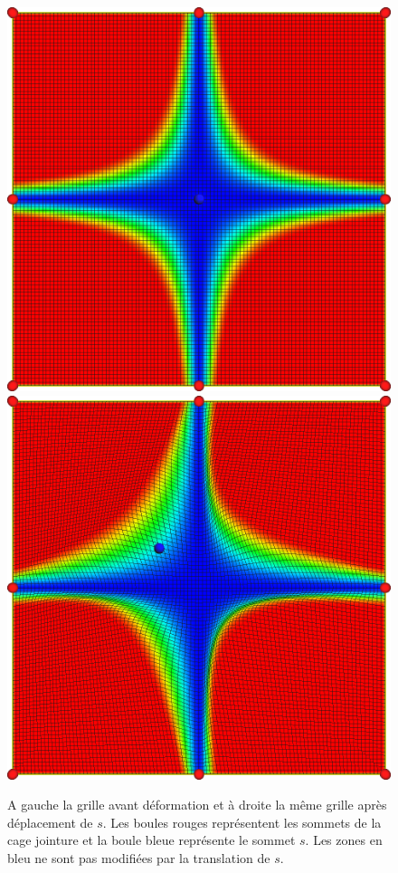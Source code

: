\begin{figure}[h]
  \begin{center}
    \includegraphics[scale=0.35]{starCage-jointure}
    \includegraphics[scale=0.35]{starCage-jointure-deformation}
    \caption{A gauche la grille avant déformation et à droite la même
      grille après déplacement de $s$. Les boules rouges représentent
      les sommets de la cage jointure et la boule bleue représente le
      sommet $s$. Les zones en bleu ne sont pas modifiées par la
      translation de $s$.}
    \label{MELjoi}
  \end{center}
\end{figure}

